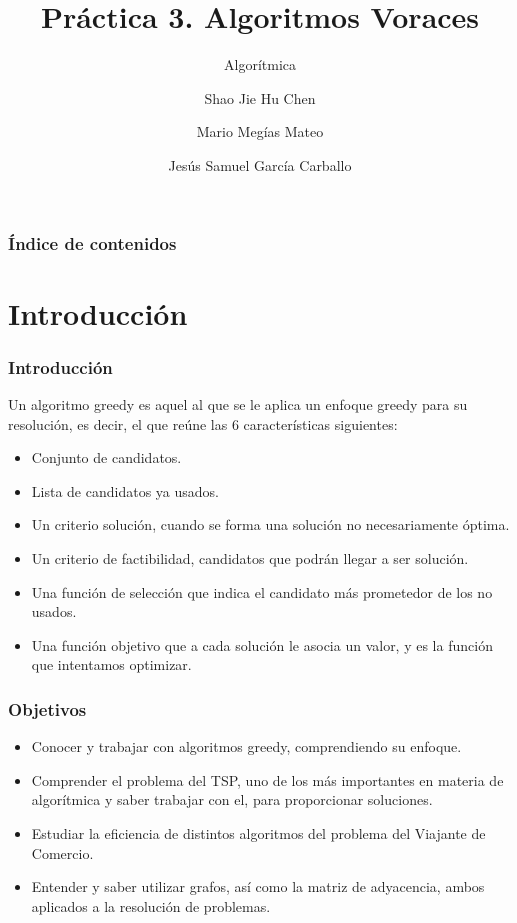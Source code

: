 \documentclass[13pt]{beamer}
\author{Shao Jie Hu Chen \and Mario Megías Mateo \and Jesús Samuel García Carballo}
\title{Práctica 3. Algoritmos Voraces}
\subtitle{Algorítmica}
\institute{Equipo Rojo}
\begin{document}
	
	\begin{frame}[plain]
		\maketitle
	\end{frame}
	
	\begin{frame}
		\frametitle{Índice de contenidos}
		\tableofcontents
	\end{frame}


    \section{Introducción}

	\begin{frame}
		\frametitle{Introducción}
		Un algoritmo greedy es aquel al que se le aplica un enfoque greedy para su resolución, es decir, el que reúne las 6 características siguientes:
		\begin{itemize}
			\item Conjunto de candidatos.
			\item Lista de candidatos ya usados.
			\item Un criterio solución, cuando se forma una solución no necesariamente óptima.
			\item Un criterio de factibilidad, candidatos que podrán llegar a ser solución.
			\item Una función de selección que indica el candidato más prometedor de los no usados.
			\item Una función objetivo que a cada solución le asocia un valor, y es la función que intentamos optimizar.
		\end{itemize}
	\end{frame}

	\begin{frame}
		\frametitle{Objetivos}
			\begin{itemize}
				\item Conocer y trabajar con algoritmos greedy, comprendiendo su enfoque.
				\item Comprender el problema del TSP, uno de los más importantes en materia de algorítmica y saber trabajar con el, para proporcionar soluciones.
				\item Estudiar la eficiencia de distintos algoritmos del problema del Viajante de Comercio.
				\item Entender y saber utilizar grafos, así como la matriz de adyacencia, ambos aplicados a la resolución de problemas.
			\end{itemize}		
	\end{frame}
\end{document}
